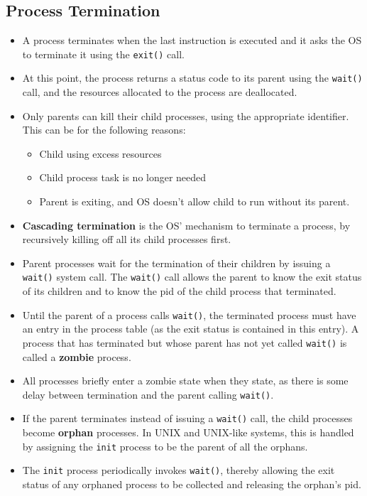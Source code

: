 \documentclass{article}
\theoremstyle{plain}
\theoremstyle{definition}
\begin{document}
\subsection{Process Termination}
\begin{itemize}
    \item A process terminates when the last instruction is executed and it asks the OS to terminate it using the \texttt{exit()} call. 
    
    \item At this point, the process returns a status code to its parent using the \texttt{wait()} call, and the resources allocated to the process are deallocated. 
    
    \item Only parents can kill their child processes, using the appropriate identifier. This can be for the following reasons:
    \begin{itemize}
        \item Child using excess resources
        
        \item Child process task is no longer needed
        
        \item Parent is exiting, and OS doesn't allow child to run without its parent.
    \end{itemize}
    
    \item \textbf{Cascading termination} is the OS' mechanism to terminate a process, by recursively killing off all its child processes first.
    
    \item Parent processes wait for the termination of their children by issuing a \texttt{wait()} system call. The \texttt{wait()} call allows the parent to know the exit status of its children and to know the pid of the child process that terminated. 
    
    \item Until the parent of a process calls \texttt{wait()}, the terminated process must have an entry in the process table (as the exit status is contained in this entry). A process that has terminated but whose parent has not yet called \texttt{wait()} is called a \textbf{zombie} process.
    
    \item All processes briefly enter a zombie state when they state, as there is some delay between termination and the parent calling \texttt{wait()}.
    
    \item If the parent terminates instead of issuing a \texttt{wait()} call, the child processes become \textbf{orphan} processes. In UNIX and UNIX-like systems, this is handled by assigning the \texttt{init} process to be the parent of all the orphans. 
    
    \item The \texttt{init} process periodically invokes \texttt{wait()}, thereby allowing the exit status of any orphaned process to be collected and releasing the orphan’s pid.
\end{itemize}
\end{document}

